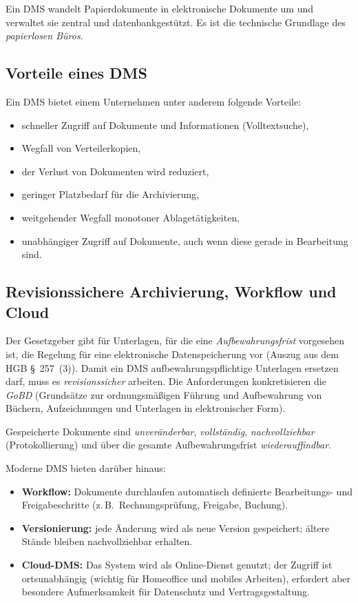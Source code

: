 \documentclass[11pt, a4paper]{article}
\begin{document}
\begin{merksatz}
Ein DMS wandelt Papierdokumente in elektronische Dokumente um und verwaltet sie
zentral und datenbankgestützt. Es ist die technische Grundlage des \emph{papierlosen
Büros}.
\end{merksatz}

\subsection{Vorteile eines DMS}

Ein DMS bietet einem Unternehmen unter anderem folgende Vorteile:

\begin{itemize}
  \item schneller Zugriff auf Dokumente und Informationen (Volltextsuche),
  \item Wegfall von Verteilerkopien,
  \item der Verlust von Dokumenten wird reduziert,
  \item geringer Platzbedarf für die Archivierung,
  \item weitgehender Wegfall monotoner Ablagetätigkeiten,
  \item unabhängiger Zugriff auf Dokumente, auch wenn diese gerade in Bearbeitung sind.
\end{itemize}

\subsection{Revisionssichere Archivierung, Workflow und Cloud}

Der Gesetzgeber gibt für Unterlagen, für die eine \emph{Aufbewahrungsfrist} vorgesehen
ist, die Regelung für eine elektronische Datenspeicherung vor (Auszug aus dem
HGB \S~257~(3)). Damit ein DMS aufbewahrungspflichtige Unterlagen ersetzen darf, muss
es \emph{revisionssicher} arbeiten. Die Anforderungen konkretisieren die \emph{GoBD}
(Grundsätze zur ordnungsmäßigen Führung und Aufbewahrung von Büchern, Aufzeichnungen
und Unterlagen in elektronischer Form).

\begin{merksatz}[title={\bfseries Revisionssicher heißt}]
Gespeicherte Dokumente sind \emph{unveränderbar}, \emph{vollständig}, \emph{nachvollziehbar}
(Protokollierung) und über die gesamte Aufbewahrungsfrist \emph{wiederauffindbar}.
\end{merksatz}

Moderne DMS bieten darüber hinaus:
\begin{itemize}
  \item \textbf{Workflow:} Dokumente durchlaufen automatisch definierte Bearbeitungs- und Freigabeschritte (z.\,B.\ Rechnungsprüfung, Freigabe, Buchung).
  \item \textbf{Versionierung:} jede Änderung wird als neue Version gespeichert; ältere Stände bleiben nachvollziehbar erhalten.
  \item \textbf{Cloud-DMS:} Das System wird als Online-Dienst genutzt; der Zugriff ist ortsunabhängig (wichtig für Homeoffice und mobiles Arbeiten), erfordert aber besondere Aufmerksamkeit für Datenschutz und Vertragsgestaltung.
\end{itemize}
\end{document}
